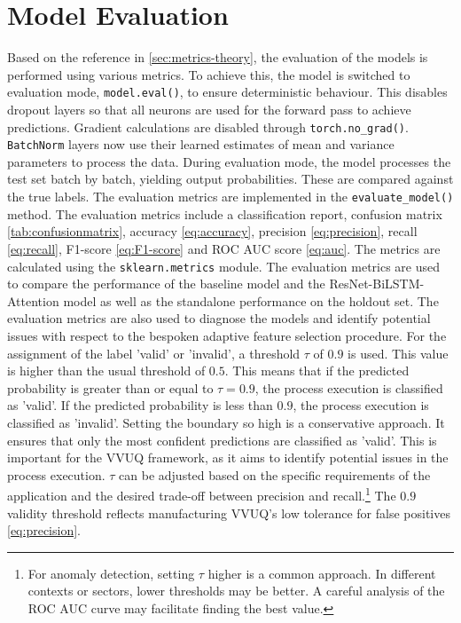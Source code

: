 \section{Model Evaluation}
Based on the reference in \autoref{sec:metrics-theory}, the evaluation of the models is performed using various metrics. To achieve this, the model is switched to evaluation mode, \texttt{model.eval()}, to ensure deterministic behaviour. This disables dropout layers so that all neurons are used for the forward pass to achieve predictions. Gradient calculations are disabled through \texttt{torch.no\_grad()}. \texttt{BatchNorm} layers now use their learned estimates of mean and variance parameters to process the data. During evaluation mode, the model processes the test set batch by batch, yielding output probabilities. These are compared against the true labels. The evaluation metrics are implemented in the \texttt{evaluate\_model()} method. The evaluation metrics include a classification report, confusion matrix \autoref{tab:confusionmatrix}, accuracy \autoref{eq:accuracy}, precision \autoref{eq:precision}, recall \autoref{eq:recall}, F1-score \autoref{eq:F1-score} and ROC AUC score \autoref{eq:auc}. The metrics are calculated using the \texttt{sklearn.metrics} module. The evaluation metrics are used to compare the performance of the baseline model and the ResNet-BiLSTM-Attention model as well as the standalone performance on the holdout set. The evaluation metrics are also used to diagnose the models and identify potential issues with respect to the bespoken adaptive feature selection procedure. For the assignment of the label 'valid' or 'invalid', a threshold $\tau$ of $0.9$ is used. This value is higher than the usual threshold of $0.5$. This means that if the predicted probability is greater than or equal to $\tau = 0.9$, the process execution is classified as 'valid'. If the predicted probability is less than $0.9$, the process execution is classified as 'invalid'. Setting the boundary so high is a conservative approach. It ensures that only the most confident predictions are classified as 'valid'. This is important for the VVUQ framework, as it aims to identify potential issues in the process execution. $\tau$ can be adjusted based on the specific requirements of the application and the desired trade-off between precision and recall.\footnote{For anomaly detection, setting $\tau$ higher is a common approach. In different contexts or sectors, lower thresholds may be better. A careful analysis of the ROC AUC curve may facilitate finding the best value.} The $0.9$ validity threshold reflects manufacturing VVUQ's low tolerance for false positives \autoref{eq:precision}.